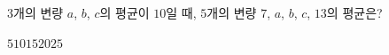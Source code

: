 $3$개의 변량 $a$, $b$, $c$의 평균이 $10$일 때, $5$개의 변량 $7$, $a$, $b$, $c$, $13$의 평균은?
\begin{choices32}{$5$}{$10$}{$15$}{$20$}{$25$}\end{choices32}
